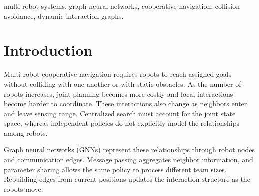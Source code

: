 \documentclass[conference]{IEEEtran}
\begin{document}
\begin{abstract}
Multi-robot navigation requires coordinated motion and collision avoidance
under changing neighbor relations and limited communication. This paper
presents a dynamic graph neural policy that represents robots as nodes and
local communication links as edges. Five-dimensional relative-motion edge
features encode relative position, velocity, and closing speed, while shared
message passing produces local velocity commands for variable-size teams.
The multi-scale policy uses mixed-expert imitation with separation,
goal-progress, and velocity-consistency losses, and an external safety filter corrects approaching robot
pairs during execution. Evaluation covers four map families and teams of
5--40 robots, with 30 unseen seeds per multi-scale configuration. Local
message passing improves goal-reaching success over an edge-free policy of
the same capacity. Safety filtering reduces close encounters and increases
minimum inter-robot separation. In the tested 5--10-robot settings, the
filtered policies achieve high collision-free success while retaining
millisecond-level control time. These results support the use of local graph
interaction and safety filtering for cooperative navigation at low to
moderate team densities.
\end{abstract}

\begin{IEEEkeywords}
multi-robot systems, graph neural networks, cooperative navigation, collision
avoidance, dynamic interaction graphs.
\end{IEEEkeywords}

\section{Introduction}

Multi-robot cooperative navigation requires robots to reach assigned goals
without colliding with one another or with static obstacles. As the number
of robots increases, joint planning becomes more costly and local
interactions become harder to coordinate. These interactions also change as
neighbors enter and leave sensing range. Centralized search must account for
the joint state space, whereas independent policies do not explicitly model
the relationships among robots.

Graph neural networks (GNNs) represent these relationships through robot
nodes and communication edges. Message passing aggregates neighbor
information, and parameter sharing allows the same policy to process
different team sizes. Rebuilding edges from current positions updates the
interaction structure as the robots move.
\end{document}
